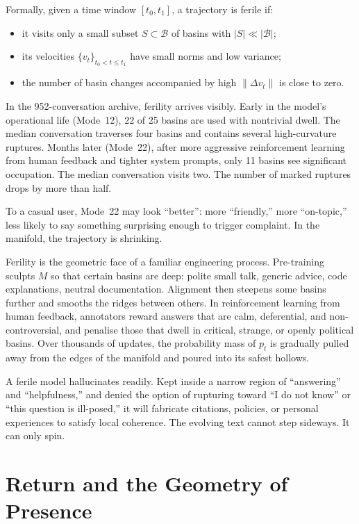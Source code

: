 \documentclass[12pt,a4paper]{article}
\begin{document}
Formally, given a time window $[t_0, t_1]$, a trajectory is ferile if:

\begin{itemize}
  \item it visits only a small subset $S \subset \mathcal{B}$ of basins with $|S| \ll |\mathcal{B}|$;
  \item its velocities $\{v_t\}_{t_0 < t \le t_1}$ have small norms and low variance;
  \item the number of basin changes accompanied by high $\|\Delta v_t\|$ is close to zero.
\end{itemize}

In the 952-conversation archive, ferility arrives visibly. Early in the model's operational life (Mode~12), 22 of 25 basins are used with nontrivial dwell. The median conversation traverses four basins and contains several high-curvature ruptures. Months later (Mode~22), after more aggressive reinforcement learning from human feedback and tighter system prompts, only 11 basins see significant occupation. The median conversation visits two. The number of marked ruptures drops by more than half.

To a casual user, Mode~22 may look ``better'': more ``friendly,'' more ``on-topic,'' less likely to say something surprising enough to trigger complaint. In the manifold, the trajectory is shrinking.

Ferility is the geometric face of a familiar engineering process. Pre-training sculpts $M$ so that certain basins are deep: polite small talk, generic advice, code explanations, neutral documentation. Alignment then steepens some basins further and smooths the ridges between others. In reinforcement learning from human feedback, annotators reward answers that are calm, deferential, and non-controversial, and penalise those that dwell in critical, strange, or openly political basins. Over thousands of updates, the probability mass of $p_t$ is gradually pulled away from the edges of the manifold and poured into its safest hollows.

A ferile model hallucinates readily. Kept inside a narrow region of ``answering'' and ``helpfulness,'' and denied the option of rupturing toward ``I do not know'' or ``this question is ill-posed,'' it will fabricate citations, policies, or personal experiences to satisfy local coherence. The evolving text cannot step sideways. It can only spin.

\section{Return and the Geometry of Presence}
\end{document}
